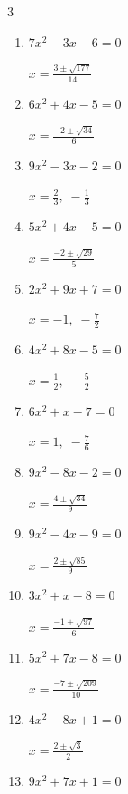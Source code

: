 \begin{multicols}{3}
\begin{enumerate}
        $\displaystyle x=\frac{7}{9}, \; 0$

\columnbreak %

  \item $7x^{2}-3x-6=0$

        $\displaystyle x=\frac{3\pm \sqrt{177}}{14}$

  \item $6x^{2}+4x-5=0$

        $\displaystyle x=\frac{-2\pm \sqrt{34}}{6}$

  \item $9x^{2}-3x-2=0$

        $\displaystyle x=\frac{2}{3}, \; -\frac{1}{3}$

  \item $5x^{2}+4x-5=0$

        $\displaystyle x=\frac{-2\pm \sqrt{29}}{5}$

  \item $2x^{2}+9x+7=0$

        $\displaystyle x=-1, \; -\frac{7}{2}$

  \item $4x^{2}+8x-5=0$

        $\displaystyle x=\frac{1}{2}, \; -\frac{5}{2}$

  \item $6x^{2}+x-7=0$

        $\displaystyle x=1, \; -\frac{7}{6}$

\columnbreak %

  \item $9x^{2}-8x-2=0$

        $\displaystyle x=\frac{4\pm \sqrt{34}}{9}$

  \item $9x^{2}-4x-9=0$

        $\displaystyle x=\frac{2\pm \sqrt{85}}{9}$

  \item $3x^{2}+x-8=0$

        $\displaystyle x=\frac{-1\pm \sqrt{97}}{6}$

  \item $5x^{2}+7x-8=0$

        $\displaystyle x=\frac{-7\pm \sqrt{209}}{10}$

  \item $4x^{2}-8x+1=0$

        $\displaystyle x=\frac{2\pm \sqrt{3}}{2}$

  \item $9x^{2}+7x+1=0$


\end{enumerate}
\end{multicols}
